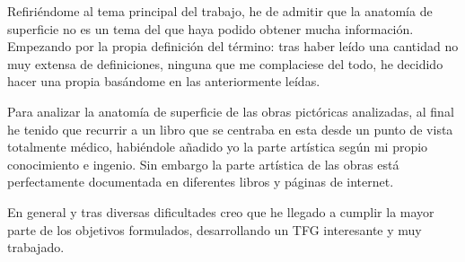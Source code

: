 Refiriéndome al tema principal del trabajo, he de admitir que la anatomía de superficie no es un tema del que haya podido obtener mucha información. Empezando por la propia definición del término: tras haber leído una cantidad no muy extensa de definiciones, ninguna que me complaciese del todo, he decidido hacer una propia basándome en las anteriormente leídas.

Para analizar la anatomía de superficie de las obras pictóricas analizadas, al final he tenido que recurrir a un libro que se centraba en esta desde un punto de vista totalmente médico, habiéndole añadido yo la parte artística según mi propio conocimiento e ingenio. Sin embargo la parte artística de las obras está perfectamente documentada en diferentes libros y páginas de internet.

En general y tras diversas dificultades %
creo que he llegado a cumplir la mayor parte de los objetivos formulados, desarrollando un TFG interesante y muy trabajado.